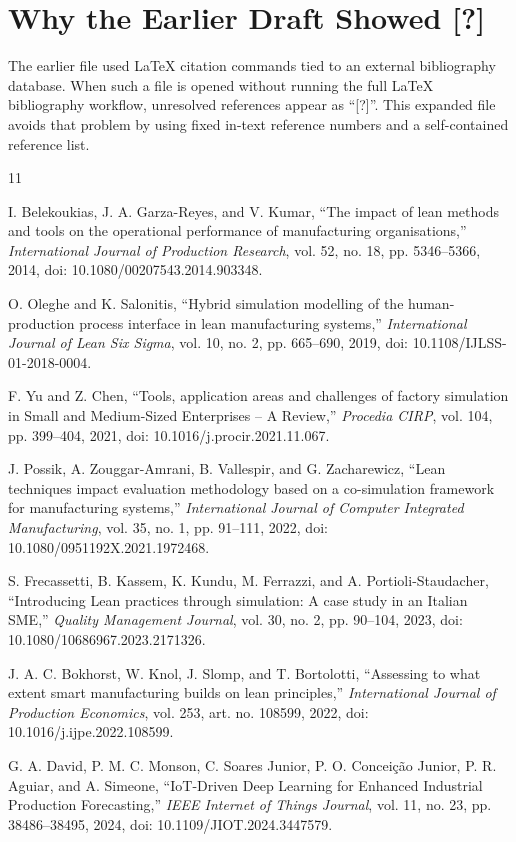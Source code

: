 \documentclass[journal]{IEEEtran}
\begin{document}
\section*{Why the Earlier Draft Showed [?]}
The earlier file used LaTeX citation commands tied to an external bibliography database. When such a file is opened without running the full LaTeX bibliography workflow, unresolved references appear as ``[?]''. This expanded file avoids that problem by using fixed in-text reference numbers and a self-contained reference list.

\begin{thebibliography}{11}

I. Belekoukias, J. A. Garza-Reyes, and V. Kumar, ``The impact of lean methods and tools on the operational performance of manufacturing organisations,'' \emph{International Journal of Production Research}, vol. 52, no. 18, pp. 5346--5366, 2014, doi: 10.1080/00207543.2014.903348.

O. Oleghe and K. Salonitis, ``Hybrid simulation modelling of the human-production process interface in lean manufacturing systems,'' \emph{International Journal of Lean Six Sigma}, vol. 10, no. 2, pp. 665--690, 2019, doi: 10.1108/IJLSS-01-2018-0004.

F. Yu and Z. Chen, ``Tools, application areas and challenges of factory simulation in Small and Medium-Sized Enterprises -- A Review,'' \emph{Procedia CIRP}, vol. 104, pp. 399--404, 2021, doi: 10.1016/j.procir.2021.11.067.

J. Possik, A. Zouggar-Amrani, B. Vallespir, and G. Zacharewicz, ``Lean techniques impact evaluation methodology based on a co-simulation framework for manufacturing systems,'' \emph{International Journal of Computer Integrated Manufacturing}, vol. 35, no. 1, pp. 91--111, 2022, doi: 10.1080/0951192X.2021.1972468.

S. Frecassetti, B. Kassem, K. Kundu, M. Ferrazzi, and A. Portioli-Staudacher, ``Introducing Lean practices through simulation: A case study in an Italian SME,'' \emph{Quality Management Journal}, vol. 30, no. 2, pp. 90--104, 2023, doi: 10.1080/10686967.2023.2171326.

J. A. C. Bokhorst, W. Knol, J. Slomp, and T. Bortolotti, ``Assessing to what extent smart manufacturing builds on lean principles,'' \emph{International Journal of Production Economics}, vol. 253, art. no. 108599, 2022, doi: 10.1016/j.ijpe.2022.108599.

G. A. David, P. M. C. Monson, C. Soares Junior, P. O. Concei\c{c}\~ao Junior, P. R. Aguiar, and A. Simeone, ``IoT-Driven Deep Learning for Enhanced Industrial Production Forecasting,'' \emph{IEEE Internet of Things Journal}, vol. 11, no. 23, pp. 38486--38495, 2024, doi: 10.1109/JIOT.2024.3447579.


\end{thebibliography}
\end{document}
